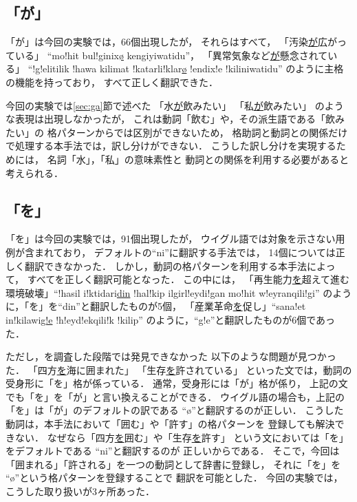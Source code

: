 \subsection{「が」}
「が」は今回の実験では，66個出現したが，
それらはすべて，
「汚染\underline{が}広がっている」 ``mo!hit bul!ginix\underline{\o} kengiyiwatidu''，
「異常気象など\underline{が}懸念されている」
``!g!elitilik !hawa kilimat !katarli!klar\underline{\o} !endix!e !kiliniwatidu''
のように主格の機能を持っており，
すべて正しく翻訳できた．

今回の実験では\ref{sec:ga}節で述べた
「水\underline{が}飲みたい」
「私\underline{が}飲みたい」
のような表現は出現しなかったが，
これは動詞「飲む」や，その派生語である「飲みたい」の
格パターンからでは区別ができないため，
格助詞と動詞との関係だけで処理する本手法では，訳し分けができない．
こうした訳し分けを実現するためには，
名詞「水」，「私」の意味素性と
動詞との関係を利用する必要があると考えられる．

\subsection{「を」}
「を」は今回の実験では，91個出現したが，
ウイグル語では対象を示さない用例が含まれており，
デフォルトの``ni''に翻訳する手法では，
14個については正しく翻訳できなかった．
しかし，動詞の格パターンを利用する本手法によって，
すべてを正しく翻訳可能となった．
この中には，
「再生能力\underline{を}超えて進む環境破壊」``!hasil i!ktidari\underline{din}
!hal!kip ilgirl!eydi!gan mo!hit w!eyranqili!gi''
のように，「を」を``din''と翻訳したものが5個，
「産業革命\underline{を}促し」``sana!et in!kilawi\underline{g!e}
!h!eyd!ekqili!k !kilip''
のように，``g!e''と翻訳したものが6個であった．

ただし，\cite{IPAL}を調査した段階では発見できなかった
以下のような問題が見つかった．
「四方\underline{を}海に囲まれた」
「生存\underline{を}許されている」
といった文では，動詞の受身形に「を」格が係っている．
通常，受身形には「が」格が係り，
上記の文でも「を」を「が」と言い換えることができる．
ウイグル語の場合も，上記の「を」は「が」のデフォルトの訳である
``\o''と翻訳するのが正しい．
こうした動詞は，本手法において「囲む」や「許す」の格パターンを
登録しても解決できない．
なぜなら「四方\underline{を}囲む」や「生存\underline{を}許す」
という文においては「を」をデフォルトである ``ni''と翻訳するのが
正しいからである．
そこで，今回は「囲まれる」「許される」を一つの動詞として辞書に登録し，
それに「を」を ``\o''という格パターンを登録することで
翻訳を可能とした．
今回の実験では，こうした取り扱いが3ヶ所あった．

